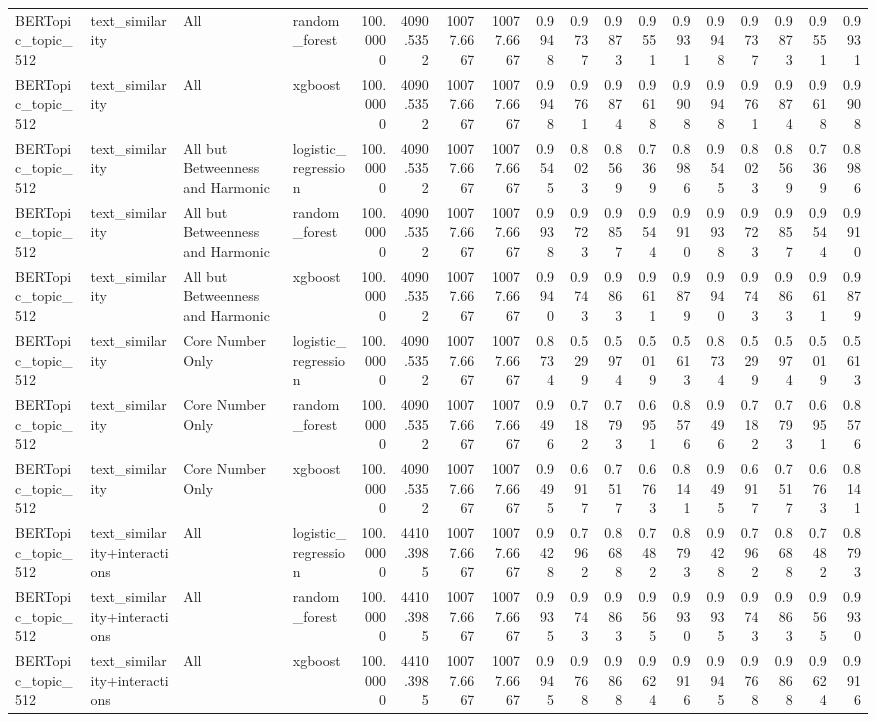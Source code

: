 \begin{tabular}{llllrrrrrrrrrrrrrr}
BERTopic_topic_512 & text_similarity & All & random_forest & 100.0000 & 4090.5352 & 10077.6667 & 10077.6667 & 0.9948 & 0.9737 & 0.9873 & 0.9551 & 0.9931 & 0.9948 & 0.9737 & 0.9873 & 0.9551 & 0.9931 \\
BERTopic_topic_512 & text_similarity & All & xgboost & 100.0000 & 4090.5352 & 10077.6667 & 10077.6667 & 0.9948 & 0.9761 & 0.9874 & 0.9618 & 0.9908 & 0.9948 & 0.9761 & 0.9874 & 0.9618 & 0.9908 \\
BERTopic_topic_512 & text_similarity & All but Betweenness and Harmonic & logistic_regression & 100.0000 & 4090.5352 & 10077.6667 & 10077.6667 & 0.9545 & 0.8023 & 0.8569 & 0.7369 & 0.8986 & 0.9545 & 0.8023 & 0.8569 & 0.7369 & 0.8986 \\
BERTopic_topic_512 & text_similarity & All but Betweenness and Harmonic & random_forest & 100.0000 & 4090.5352 & 10077.6667 & 10077.6667 & 0.9938 & 0.9723 & 0.9857 & 0.9544 & 0.9910 & 0.9938 & 0.9723 & 0.9857 & 0.9544 & 0.9910 \\
BERTopic_topic_512 & text_similarity & All but Betweenness and Harmonic & xgboost & 100.0000 & 4090.5352 & 10077.6667 & 10077.6667 & 0.9940 & 0.9743 & 0.9863 & 0.9611 & 0.9879 & 0.9940 & 0.9743 & 0.9863 & 0.9611 & 0.9879 \\
BERTopic_topic_512 & text_similarity & Core Number Only & logistic_regression & 100.0000 & 4090.5352 & 10077.6667 & 10077.6667 & 0.8734 & 0.5299 & 0.5974 & 0.5019 & 0.5613 & 0.8734 & 0.5299 & 0.5974 & 0.5019 & 0.5613 \\
BERTopic_topic_512 & text_similarity & Core Number Only & random_forest & 100.0000 & 4090.5352 & 10077.6667 & 10077.6667 & 0.9496 & 0.7182 & 0.7793 & 0.6951 & 0.8576 & 0.9496 & 0.7182 & 0.7793 & 0.6951 & 0.8576 \\
BERTopic_topic_512 & text_similarity & Core Number Only & xgboost & 100.0000 & 4090.5352 & 10077.6667 & 10077.6667 & 0.9495 & 0.6917 & 0.7517 & 0.6763 & 0.8141 & 0.9495 & 0.6917 & 0.7517 & 0.6763 & 0.8141 \\
BERTopic_topic_512 & text_similarity+interactions & All & logistic_regression & 100.0000 & 4410.3985 & 10077.6667 & 10077.6667 & 0.9428 & 0.7962 & 0.8688 & 0.7482 & 0.8793 & 0.9428 & 0.7962 & 0.8688 & 0.7482 & 0.8793 \\
BERTopic_topic_512 & text_similarity+interactions & All & random_forest & 100.0000 & 4410.3985 & 10077.6667 & 10077.6667 & 0.9935 & 0.9743 & 0.9863 & 0.9565 & 0.9930 & 0.9935 & 0.9743 & 0.9863 & 0.9565 & 0.9930 \\
BERTopic_topic_512 & text_similarity+interactions & All & xgboost & 100.0000 & 4410.3985 & 10077.6667 & 10077.6667 & 0.9945 & 0.9768 & 0.9868 & 0.9624 & 0.9916 & 0.9945 & 0.9768 & 0.9868 & 0.9624 & 0.9916 \\

\end{tabular}
